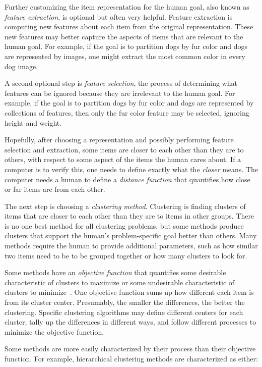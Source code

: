 Further customizing the item representation for the human goal, also known as {\it feature extraction}, is optional but often very helpful. Feature extraction is computing new features about each item from the original representation. These new features may better capture the aspects of items that are relevant to the human goal. For example, if the goal is to partition dogs by fur color and dogs are represented by images, one might extract the most common color in every dog image.

A second optional step is {\it feature selection}, the process of determining what features can be ignored because they are irrelevant to the human goal. For example, if the goal is to partition dogs by fur color and dogs are represented by collections of features, then only the fur color feature may be selected, ignoring height and weight.

Hopefully, after choosing a representation and possibly performing feature selection and extraction, some items are closer to each other than they are to others, with respect to some aspect of the items the human cares about. If a computer is to verify this, one needs to define exactly what the {\it closer} means. The computer needs a human to define a {\it distance function} that quantifies how close or far items are from each other.

The next step is choosing a {\it clustering method}. Clustering is finding clusters of items that are closer to each other than they are to items in other groups. There is no one best method for all clustering problems, but some methods produce clusters that support the human's problem-specific goal better than others. Many methods require the human to provide additional parameters, such as how similar two items need to be to be grouped together or how many clusters to look for. 

Some methods have an {\it objective function} that quantifies some desirable characteristic of clusters to maximize or some undesirable characteristic of clusters to minimize~\cite{Jain50}. One objective function sums up how different each item is from its cluster center. Presumably, the smaller the differences, the better the clustering. Specific clustering algorithms may define different centers for each cluster, tally up the differences in different ways, and follow different processes to minimize the objective function.

Some methods are more easily characterized by their process than their objective function. For example, hierarchical clustering methods are characterized as either:

